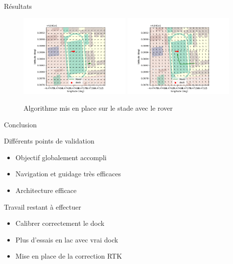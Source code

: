 \documentclass[pdftex,beamer,aspectratio=169]{beamer}
\theoremstyle{definition}
\theoremstyle{example}
\theoremstyle{plain}
\begin{document}
\begin{frame}[fragile]{Résultats}
  \begin{figure}
    \centering
    \includegraphics[width=0.49\textwidth]{visu_2.png}
    \includegraphics[width=0.49\textwidth]{visu_1.png}
    \caption*{Algorithme mis en place sur le stade avec le rover}
  \end{figure}
\end{frame}

\begin{frame}[fragile]{Conclusion}
  \begin{minipage}{0.49\textwidth}
    Différents points de validation
    \begin{itemize}
      \item Objectif globalement accompli
      \item Navigation et guidage très efficaces
      \item Architecture efficace
    \end{itemize}
  \end{minipage}
  \begin{minipage}{0.49\textwidth}
    Travail restant à effectuer
    \begin{itemize}
      \item Calibrer correctement le dock
      \item Plus d'essais en lac avec vrai dock
      \item Mise en place de la correction RTK
    \end{itemize}
  \end{minipage}
\end{frame}
\end{document}
